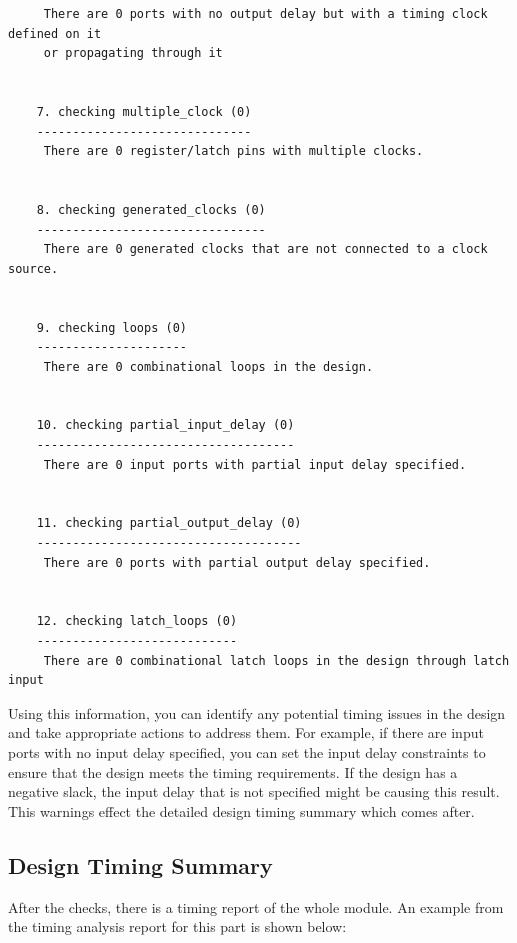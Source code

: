\documentclass{report}
\begin{document}
\begin{verbatim}
     There are 0 ports with no output delay but with a timing clock defined on it 
     or propagating through it
    
    
    7. checking multiple_clock (0)
    ------------------------------
     There are 0 register/latch pins with multiple clocks.
    
    
    8. checking generated_clocks (0)
    --------------------------------
     There are 0 generated clocks that are not connected to a clock source.
    
    
    9. checking loops (0)
    ---------------------
     There are 0 combinational loops in the design.
    
    
    10. checking partial_input_delay (0)
    ------------------------------------
     There are 0 input ports with partial input delay specified.
    
    
    11. checking partial_output_delay (0)
    -------------------------------------
     There are 0 ports with partial output delay specified.
    
    
    12. checking latch_loops (0)
    ----------------------------
     There are 0 combinational latch loops in the design through latch input
\end{verbatim}
Using this information, you can identify any potential timing issues in the design and take appropriate actions to address them. For example, if there are input ports with no input delay specified, you can set the input delay constraints to ensure that the design meets the timing requirements.
If the design has a negative slack, the input delay that is not specified might be causing this result.
This warnings effect the detailed design timing summary which comes after.

\subsection{Design Timing Summary}
After the checks, there is a timing report of the whole module.
An example from the timing analysis report for this part is shown below:
\end{document}
